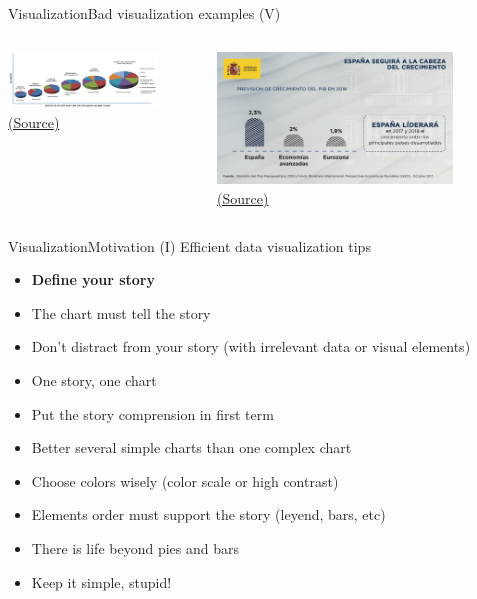 \documentclass[10pt,compress]{beamer} %
\begin{document}
\begin{frame}{Visualization}{Bad visualization examples (V)}
	\begin{columns}
	\centering \includegraphics[width=0.8\textwidth]{figs/bad9.jpg}\\
	\centering \tiny \href{http://viz.wtf/}{(Source)}

	\bigskip

	\centering \includegraphics[width=0.8\textwidth]{figs/bad11.png}\\
	\tiny \href{http://viz.wtf/}{(Source)}
	\end{columns}
\end{frame}

\begin{frame}{Visualization}{Motivation (I)}
	Efficient data visualization tips
	\begin{itemize}
		\item \textbf{Define your story}
		\item The chart must tell the story
		\item Don't distract from your story (with irrelevant data or visual elements)
		\item One story, one chart
		\item Put the story comprension in first term
		\item Better several simple charts than one complex chart
		\item Choose colors wisely (color scale or high contrast)
		\item Elements order must support the story (leyend, bars, etc)
		\item There is life beyond pies and bars
		\item Keep it simple, stupid!
	\end{itemize}
\end{frame}
\end{document}
